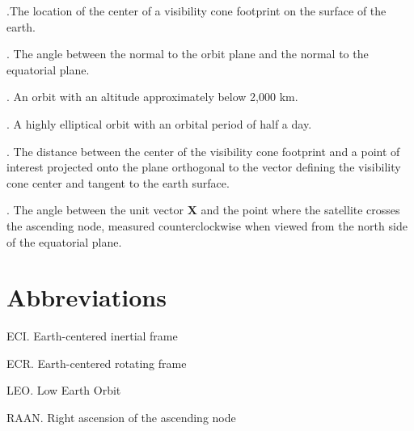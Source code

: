 \documentclass[oneside,12pt]{report}
\begin{document}
\vspace{8pt} .The location of the center of a visibility cone footprint on the surface of the earth.

\vspace{8pt}
.  The angle between the normal to the orbit plane
and the normal to the equatorial plane.

\vspace{8pt} . An orbit with an altitude approximately below 2,000 km.

\vspace{8pt} . A highly elliptical orbit with an orbital period of half a day.

\vspace{8pt} . The distance between the center of the visibility cone footprint and a point of interest projected onto the plane orthogonal to the vector defining the visibility cone center and tangent to the earth surface.

\vspace{8pt}
. The angle
between the unit vector $\bm{X}$ and the point where the satellite crosses the
ascending node, measured counterclockwise when viewed from the north side of
the equatorial plane.


\chapter{Abbreviations}\label{Abbreviations}


\noindent ECI.  Earth-centered inertial frame

\vspace{5pt}

\noindent ECR.  Earth-centered rotating frame

\vspace{5pt}

\noindent LEO.  Low Earth Orbit  

\vspace{5pt}

\noindent RAAN. Right ascension of the ascending node

\vspace{5pt}




\renewcommand\bibname{Selected Bibliography Including Cited Works}
\nocite{*}  %

\end{document}
